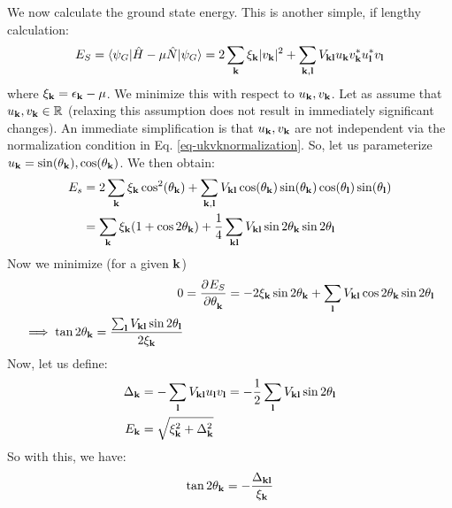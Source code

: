 We now calculate the ground state energy. This is another simple, if lengthy calculation:
\begin{equation}
    E_S = \langle \psi_G \rvert\hat{H} - \mu\hat{N}\lvert \psi_G \rangle = 2\sum_{\mathbf{k}}\xi_{\mathbf{k}}\lvert v_{\mathbf{k}} \rvert^2 + \sum_{\mathbf{k}, \mathbf{l}}V_{\mathbf{k}\mathbf{l}}u_{\mathbf{k}}v_{\mathbf{k}}^* u_{\mathbf{l}}^* v_{\mathbf{l}}
\end{equation}
where $\xi_{\mathbf{k}} = \epsilon_{\mathbf{k}} - \mu$. We minimize this with respect to $u_{\mathbf{k}}, v_{\mathbf{k}}$. Let as assume that $u_{\mathbf{k}}, v_{\mathbf{k}} \in \mathbb{R}$ (relaxing this assumption does not result in immediately significant changes). An immediate simplification is that $u_{\mathbf{k}}, v_{\mathbf{k}}$ are not independent via the normalization condition in Eq. \eqref{eq-ukvknormalization}. So, let us parameterize $u_{\mathbf{k}} = \sin(\theta_{\mathbf{k}}), \cos(\theta_{\mathbf{k}})$. We then obtain:
\begin{equation}
    \begin{split}
        E_s &= 2\sum_{\mathbf{k}}\xi_{\mathbf{k}}\cos^2(\theta_{\mathbf{k}}) + \sum_{\mathbf{k}, \mathbf{l}}V_{\mathbf{k}\mathbf{l}} \cos(\theta_{\mathbf{k}})\sin(\theta_{\mathbf{k}})\cos(\theta_{\mathbf{l}})\sin(\theta_{\mathbf{l}}) \\ &= \sum_{\mathbf{k}}\xi_{\mathbf{k}}(1 + \cos2\theta_{\mathbf{k}}) + \frac{1}{4}\sum_{\mathbf{k}\mathbf{l}}V_{\mathbf{k}\mathbf{l}}\sin 2\theta_{\mathbf{k}}\sin 2\theta_{\mathbf{l}}
    \end{split}
\end{equation}
Now we minimize (for a given $\mathbf{k}$)
\begin{equation}
    \begin{split}
        0 &= \dpd{E_S}{\theta_{\v{k}}} = -2\xi_{\v{k}}\sin 2\theta_{\v{k}} + \sum_{\v{l}}V_{\v{k}\v{l}}\cos2\theta_{\v{k}}\sin2\theta_{\v{l}}
        \\ \implies \tan 2\theta_{\v{k}} = \frac{\sum_{\v{l}}V_{\v{k}\v{l}}\sin2\theta_{\v{l}}}{2\xi_{\v{k}}}
    \end{split}
\end{equation}
Now, let us define:
\begin{equation}
    \begin{split}
        \Delta_{\mathbf{k}} &= -\sum_{\mathbf{l}}V_{\mathbf{k}\mathbf{l}}u_{\mathbf{l}}v_{\mathbf{l}} = -\frac{1}{2}\sum_{\mathbf{l}}V_{\mathbf{k}\mathbf{l}}\sin2\theta_{\mathbf{l}}
        \\ E_{\mathbf{k}} &= \sqrt{\xi_{\mathbf{k}}^2 + \Delta_{\mathbf{k}}^2}
    \end{split}
\end{equation}
So with this, we have:
\begin{equation}
    \tan2\theta_{\mathbf{k}} = -\frac{\Delta_{\mathbf{k}\mathbf{l}}}{\xi_{\mathbf{k}}}
\end{equation}
